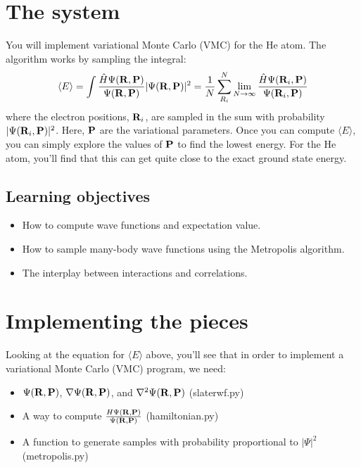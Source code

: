 \documentclass[12pt]{article}
\newcommand{\bR}{{\bf R}}
\newcommand{\bP}{{\bf P}}
\begin{document}
\section{The system} 

You will implement variational Monte Carlo (VMC) for the He atom. 
The algorithm works by sampling the integral:
\begin{equation}
  \label{eq:vmc}
  \langle
  E
  \rangle
  =
  \int
  \frac{\hat{H} \Psi(\bR,\bP)}{\Psi(\bR,\bP)}
  |\Psi(\bR,\bP)|^2
  =
  \frac{1}{N}
  \sum_{R_i}^N
  \lim_{N\to \infty}
  \frac{\hat{H} \Psi(\bR_i,\bP)}{\Psi(\bR_i,\bP)}
\end{equation}
where the electron positions, $\bR_i$, are sampled in the sum with probability $|\Psi(\bR_i,\bP)|^2$.
Here, $\bP$ are the variational parameters.
Once you can compute $\langle E \rangle$, you can simply explore the values of $\bP$ to find the lowest energy.
For the He atom, you'll find that this can get quite close to the exact ground state energy.

\subsection{Learning objectives}
\begin{itemize}
\item How to compute wave functions and expectation value.
\item How to sample many-body wave functions using the Metropolis algorithm.
\item The interplay between interactions and correlations. 
\end{itemize}

\section{Implementing the pieces}

Looking at the equation for $\langle E \rangle$ above, you'll see that in order to implement a variational Monte Carlo (VMC) program, we need:
\begin{itemize}
	\item $\Psi(\bR,\bP)$, $\nabla \Psi(\bR,\bP)$, and $\nabla^2 \Psi(\bR,\bP)$ (slaterwf.py)
	\item A way to compute $\frac{H\Psi(\bR,\bP)}{\Psi(\bR,\bP)}$ (hamiltonian.py)
	\item A function to generate samples with probability proportional to $|\Psi|^2$ (metropolis.py)
\end{itemize}
\end{document}

